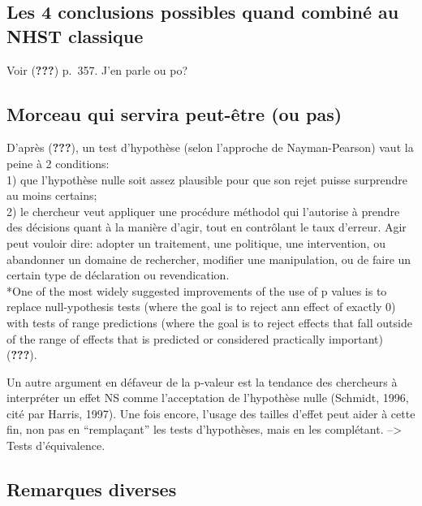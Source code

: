 \documentclass[
  english,
  man]{apa6}
\begin{document}
\hypertarget{les-4-conclusions-possibles-quand-combinuxe9-au-nhst-classique}{%
\subsection{Les 4 conclusions possibles quand combiné au NHST classique}\label{les-4-conclusions-possibles-quand-combinuxe9-au-nhst-classique}}

Voir ({\textbf{???}}) p.~357. J'en parle ou po?

\hypertarget{morceau-qui-servira-peut-uxeatre-ou-pas}{%
\subsection{Morceau qui servira peut-être (ou pas)}\label{morceau-qui-servira-peut-uxeatre-ou-pas}}

D'après ({\textbf{???}}), un test d'hypothèse (selon l'approche de Nayman-Pearson) vaut la peine à 2 conditions:\\
1) que l'hypothèse nulle soit assez plausible pour que son rejet puisse surprendre au moins certains;\\
2) le chercheur veut appliquer une procédure méthodol qui l'autorise à prendre des décisions quant à la manière d'agir, tout en contrôlant le taux d'erreur. Agir peut vouloir dire: adopter un traitement, une politique, une intervention, ou abandonner un domaine de rechercher, modifier une manipulation, ou de faire un certain type de déclaration ou revendication.\\
*One of the most widely suggested improvements of the use of p values is to replace null-ypothesis tests (where the goal is to reject ann effect of exactly 0) with tests of range predictions (where the goal is to reject effects that fall outside of the range of effects that is predicted or considered practically important) ({\textbf{???}}).

Un autre argument en défaveur de la p-valeur est la tendance des chercheurs à interpréter un effet NS comme l'acceptation de l'hypothèse nulle (Schmidt, 1996, cité par Harris, 1997). Une fois encore, l'usage des tailles d'effet peut aider à cette fin, non pas en \enquote{remplaçant} les tests d'hypothèses, mais en les complétant. --\textgreater{} Tests d'équivalence.

\hypertarget{remarques-diverses}{%
\subsection{Remarques diverses}\label{remarques-diverses}}
\end{document}
